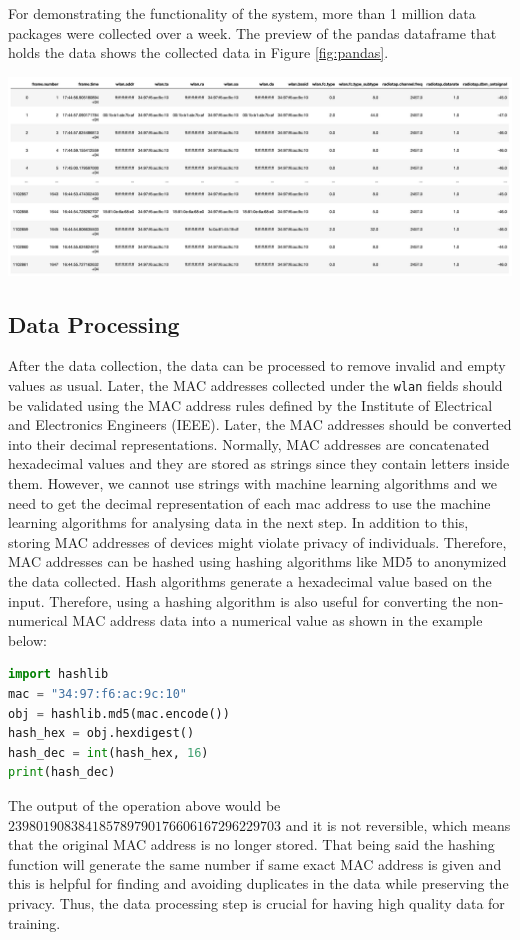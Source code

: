 \documentclass[journal, 12pt]{IEEEtran}
\begin{document}
\noindent For demonstrating the functionality of the system, more than 1 million data packages were collected over a week. The preview of the pandas dataframe that holds the data shows the collected data in Figure \ref{fig:pandas}.

\begingroup
    \center
    \medskip
    \includegraphics[width=\columnwidth]{report/interim_report/images/pandas.png}
    \label{fig:pandas}
    \medskip
\endgroup


\subsection{Data Processing} 
\noindent After the data collection, the data can be processed to remove invalid and empty values as usual. Later, the MAC addresses collected under the \texttt{wlan} fields should be validated using the MAC address rules defined by the Institute of Electrical and Electronics Engineers (IEEE). Later, the MAC addresses should be converted into their decimal representations. Normally, MAC addresses are concatenated hexadecimal values and they are stored as strings since they contain letters inside them. However, we cannot use strings with machine learning algorithms and we need to get the decimal representation of each mac address to use the machine learning algorithms for analysing data in the next step. In addition to this, storing MAC addresses of devices might violate privacy of individuals. Therefore, MAC addresses can be hashed using hashing algorithms like MD5 to anonymized the data collected. Hash algorithms generate a hexadecimal value based on the input. Therefore, using a hashing algorithm is also useful for converting the non-numerical MAC address data into a numerical value as shown in the example below:
\medskip
\begin{lstlisting}[language=python, numbers=none, mathescape]
import hashlib
mac = "34:97:f6:ac:9c:10"
obj = hashlib.md5(mac.encode())
hash_hex = obj.hexdigest()
hash_dec = int(hash_hex, 16)
print(hash_dec)
\end{lstlisting}
\medskip
\noindent The output of the operation above would be $239801908384185789790176606167296229703$ and it is not reversible, which means that the original MAC address is no longer stored. That being said the hashing function will generate the same number if same exact MAC address is given and this is helpful for finding and avoiding duplicates in the data while preserving the privacy. Thus, the data processing step is crucial for having high quality data for training. \\
\end{document}
